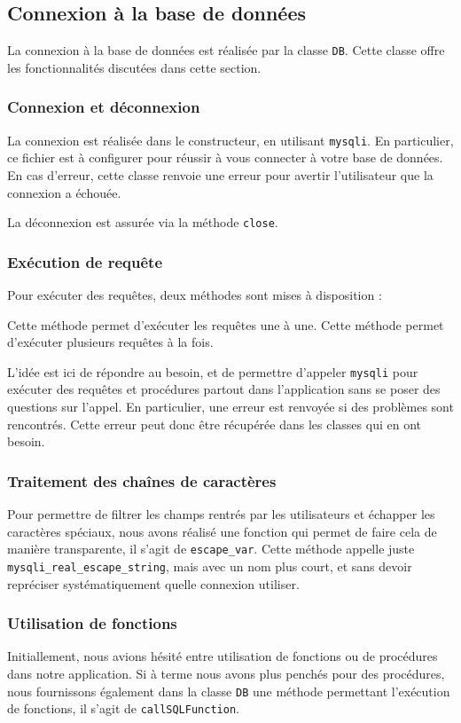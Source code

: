\subsection{Connexion à la base de données}
La connexion à la base de données est réalisée par la classe \texttt{DB}. Cette classe offre les fonctionnalités discutées dans cette section.

\subsubsection{Connexion et déconnexion}
La connexion est réalisée dans le constructeur, en utilisant \texttt{mysqli}. En particulier, ce fichier est à configurer pour réussir à vous connecter à votre base de données. En cas d'erreur, cette classe renvoie une erreur pour avertir l'utilisateur que la connexion a échouée.

La déconnexion est assurée via la méthode \texttt{close}.

\subsubsection{Exécution de requête}
Pour exécuter des requêtes, deux méthodes sont mises à disposition :
\begin{itemize}
  Cette méthode permet d'exécuter les requêtes une à une.
  Cette méthode permet d'exécuter plusieurs requêtes à la fois.
\end{itemize}
L'idée est ici de répondre au besoin, et de permettre d'appeler \texttt{mysqli} pour exécuter des requêtes et procédures partout dans l'application sans se poser des questions sur l'appel. En particulier, une erreur est renvoyée si des problèmes sont rencontrés. Cette erreur peut donc être récupérée dans les classes qui en ont besoin.

\subsubsection{Traitement des chaînes de caractères}
Pour permettre de filtrer les champs rentrés par les utilisateurs et échapper les caractères spéciaux, nous avons réalisé une fonction qui permet de faire cela de manière transparente, il s'agit de \texttt{escape\_var}. Cette méthode appelle juste \texttt{mysqli\_real\_escape\_string}, mais avec un nom plus court, et sans devoir repréciser systématiquement quelle connexion utiliser.

\subsubsection{Utilisation de fonctions}
Initiallement, nous avions hésité entre utilisation de fonctions ou de procédures dans notre application. Si à terme nous avons plus penchés pour des procédures, nous fournissons également dans la classe \texttt{DB} une méthode permettant l'exécution de fonctions, il s'agit de \texttt{callSQLFunction}.


